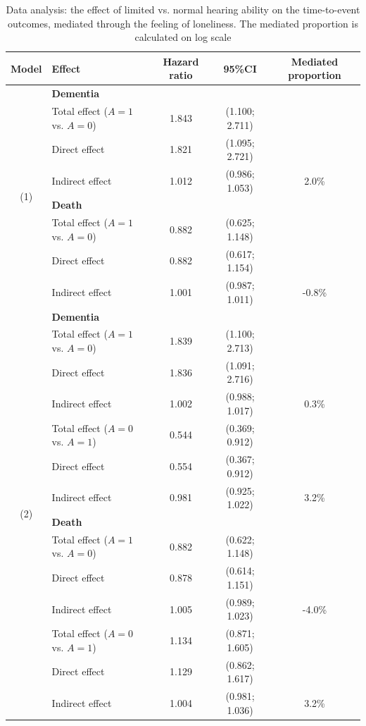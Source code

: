 \documentclass[AMA,STIX1COL]{WileyNJD-v2}
\begin{document}
\begin{table}
\centering
\caption{Data analysis: the effect of limited vs. normal hearing ability on the time-to-event outcomes, mediated through the feeling of loneliness. The mediated proportion is calculated on log scale} 
\label{tab:ma}
\begin{tabular}{c l c c c}
\hline
Model & Effect & Hazard ratio & 95\%CI & Mediated proportion\\ 
\hline
\multirow{8}{*}{(1)} & \textbf{Dementia} & & &  \\
 &Total effect  ($A=1$ vs. $A=0$)  & 1.843 & (1.100; 2.711) & \\
 &\quad Direct effect & 1.821 & (1.095; 2.721) & \\
 &\quad Indirect effect & 1.012 & (0.986; 1.053) & 2.0\%\\
 & \textbf{Death} & & &  \\
 &Total effect ($A=1$ vs. $A=0$) & 0.882 & (0.625; 1.148) & \\
 &\quad Direct effect & 0.882 & (0.617; 1.154) & \\
 &\quad Indirect effect & 1.001 & (0.987; 1.011) & -0.8\%\\
\hline
\multirow{14}{*}{(2)} & \textbf{Dementia} & & &  \\
 &Total effect ($A=1$ vs. $A=0$)  & 1.839 & (1.100; 2.713) & \\
 &\quad  Direct effect & 1.836 & (1.091; 2.716) & \\
 &\quad  Indirect effect & 1.002 & (0.988; 1.017) & 0.3\%\\
 &Total effect ($A=0$ vs. $A=1$)  & 0.544 & (0.369; 0.912) & \\
 &\quad  Direct effect  & 0.554 & (0.367; 0.912) & \\
 &\quad  Indirect effect & 0.981 & (0.925; 1.022) & 3.2\%\\
 & \textbf{Death} & & &  \\
 &Total effect ($A=1$ vs. $A=0$) & 0.882 & (0.622; 1.148) & \\
 &\quad  Direct effect & 0.878 & (0.614; 1.151) & \\
 &\quad  Indirect effect & 1.005 & (0.989; 1.023) & -4.0\%\\
 &Total effect ($A=0$ vs. $A=1$) & 1.134 & (0.871; 1.605) & \\
 &\quad  Direct effect & 1.129 & (0.862; 1.617) & \\
 &\quad Indirect effect & 1.004 & (0.981; 1.036) & 3.2\%\\
\hline
\end{tabular}
\end{table}
\end{document}
